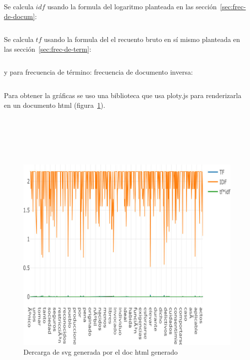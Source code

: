 \documentclass{IEEEtran}
\begin{document}
Se calcula $idf$ usando la formula del logaritmo planteada en las
sección~\ref{sec:frec-de-docum}:
\begin{code}
  \inputminted[firstline=45,lastline=49]{elixir}{../lib/corpus.ex}
\end{code}

Se calcula $tf$ usando la formula del  el recuento bruto en sí mismo
planteada en las
sección~\ref{sec:frec-de-term}:
\begin{code}
  \inputminted[firstline=51,lastline=56]{elixir}{../lib/corpus.ex}
\end{code}

y para frecuencia de término: frecuencia de documento inversa:
\begin{code}
  \inputminted[firstline=65,lastline=67]{elixir}{../lib/corpus.ex}
\end{code}

Para obtener la gráficas se uso una biblioteca que usa ploty.js para renderizarla
en un documento html (figura~\ref{fig:1}).
\\\\\\\\\\\\
\begin{figure}[h!]
  \centering
  \includegraphics[width=\linewidth]{./output}
  \caption{Dercarga de svg generada por el doc html generado}\label{fig:1}
\end{figure}
\end{document}
